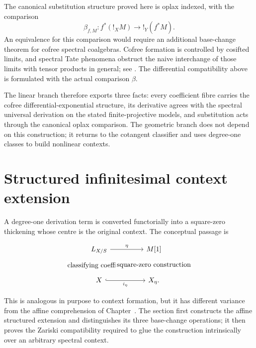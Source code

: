 \begin{remark}
\label{rem:cofree-substitution-not-equivalence}
The canonical substitution structure proved here is oplax indexed, with the
comparison
\[
    \beta_{f,M}:f^*(!_XM)\longrightarrow !_Y(f^*M).
\]
An equivalence for this comparison would require an additional base-change
theorem for cofree spectral coalgebras. Cofree formation is controlled by
cosifted limits, and spectral Tate phenomena obstruct the naive interchange of
those limits with tensor products in general; see
\cite{BachmannBurklund2026Coalgebras}. The differential compatibility above
is formulated with the actual comparison \(\beta\).
\end{remark}
The linear branch therefore exports three facts: every coefficient fibre
carries the cofree differential-exponential structure, its derivative agrees
with the spectral universal derivation on the stated finite-projective models,
and substitution acts through the canonical oplax comparison. The geometric
branch does not depend on this construction; it returns to the cotangent
classifier and uses degree-one classes to build nonlinear contexts.

\section{Structured infinitesimal context extension}
\label{sec:structured-infinitesimal-context-extension}

A degree-one derivation term is converted functorially into a square-zero
thickening whose centre is the original context. The conceptual passage is

\[
\begin{tikzcd}[column sep=huge,row sep=large]
L_{X/S} \arrow[r,"\eta"]
    \arrow[d,phantom,"{\text{classifying coefficient}}" description]
& M[1]
    \arrow[d,phantom,"{\text{square-zero construction}}" description]
\\
X \arrow[r,hook,"i_\eta"'] & X_\eta .
\end{tikzcd}
\]

This is analogous in purpose to context formation, but it has different
variance from the affine comprehension of
Chapter~. The section first constructs
the affine structured extension and distinguishes its three base-change
operations; it then proves the Zariski compatibility required to glue the
construction intrinsically over an arbitrary spectral context.

